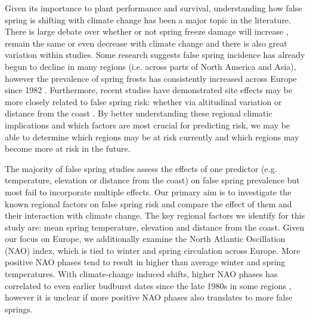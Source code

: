 \documentclass{article}\usepackage[]{graphicx}\usepackage[]{color}
\begin{document}
Given its importance to plant performance and survival, understanding how false spring is shifting with climate change has been a major topic in the literature. There is large debate over whether or not spring freeze damage will increase \citep{Hannenin1991, Augspurger2013, Labe2016}, remain the same \citep{Scheifinger2003} or even decrease \citep{Kramer1994, Vitra2017} with climate change and there is also great variation within studies. Some research suggests false spring incidence has already begun to decline in many regions (i.e. across parts of North America and Asia), however the prevalence of spring frosts has consistently increased across Europe since 1982 \citep{Liu2018}. Furthermore, recent studies have demonstrated site effects may be more closely related to false spring risk: whether via altitudinal variation \citep{Vitra2017, Ma2018} or distance from the coast \citep{Wypych2016a, Ma2018}. By better understanding these regional climatic implications and which factors are most crucial for predicting risk, we may be able to determine which regions may be at risk currently and which regions may become more at risk in the future.

The majority of false spring studies assess the effects of one predictor (e.g. temperature, elevation or distance from the coast) on false spring prevalence but most fail to incorporate multiple effects. Our primary aim is to investigate the known regional factors on false spring risk and compare the effect of them and their interaction with climate change. The key regional factors we identify for this study are: mean spring temperature, elevation and distance from the coast. Given our focus on Europe, we additionally examine the North Atlantic Oscillation (NAO) index, which is tied to winter and spring circulation across Europe. More positive NAO phases tend to result in higher than average winter and spring temperatures. With climate-change induced shifts, higher NAO phases has correlated to even earlier budburst dates since the late 1980s in some regions \citep{Chmielewski2001}, however it is unclear if more positive NAO phases also translates to more false springs.
\end{document}
